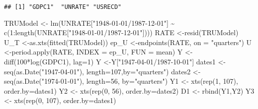 \documentclass[
]{book}
\newenvironment{Shaded}{\begin{snugshade}}{\end{snugshade}}
\newcommand{\AttributeTok}[1]{\textcolor[rgb]{0.77,0.63,0.00}{#1}}
\newcommand{\DecValTok}[1]{\textcolor[rgb]{0.00,0.00,0.81}{#1}}
\newcommand{\FunctionTok}[1]{\textcolor[rgb]{0.00,0.00,0.00}{#1}}
\newcommand{\NormalTok}[1]{#1}
\newcommand{\OtherTok}[1]{\textcolor[rgb]{0.56,0.35,0.01}{#1}}
\newcommand{\SpecialCharTok}[1]{\textcolor[rgb]{0.00,0.00,0.00}{#1}}
\newcommand{\StringTok}[1]{\textcolor[rgb]{0.31,0.60,0.02}{#1}}
\begin{document}
\begin{verbatim}
## [1] "GDPC1"  "UNRATE" "USRECD"
\end{verbatim}

\begin{Shaded}
\begin{Highlighting}[]
\NormalTok{TRUModel   }\OtherTok{\textless{}{-}} \FunctionTok{lm}\NormalTok{(UNRATE[}\StringTok{"1948{-}01{-}01/1987{-}12{-}01"}\NormalTok{] }\SpecialCharTok{\textasciitilde{}} \FunctionTok{c}\NormalTok{(}\DecValTok{1}\SpecialCharTok{:}\FunctionTok{length}\NormalTok{(UNRATE[}\StringTok{"1948{-}01{-}01/1987{-}12{-}01"}\NormalTok{])))}
\NormalTok{RATE       }\OtherTok{\textless{}{-}}\FunctionTok{resid}\NormalTok{(TRUModel) }
\NormalTok{U\_T        }\OtherTok{\textless{}{-}}\FunctionTok{as.xts}\NormalTok{(}\FunctionTok{fitted}\NormalTok{(TRUModel))}
\NormalTok{ep\_U       }\OtherTok{\textless{}{-}}\FunctionTok{endpoints}\NormalTok{(RATE, }\AttributeTok{on =} \StringTok{"quarters"}\NormalTok{)}
\NormalTok{U          }\OtherTok{\textless{}{-}}\FunctionTok{period.apply}\NormalTok{(RATE, }\AttributeTok{INDEX =}\NormalTok{ ep\_U, }\AttributeTok{FUN =}\NormalTok{ mean)}
\NormalTok{Y          }\OtherTok{\textless{}{-}}\FunctionTok{diff}\NormalTok{(}\DecValTok{100}\SpecialCharTok{*}\FunctionTok{log}\NormalTok{(GDPC1), }\AttributeTok{lag=}\DecValTok{1}\NormalTok{)}
\NormalTok{Y          }\OtherTok{\textless{}{-}}\NormalTok{Y[}\StringTok{"1947{-}04{-}01/1987{-}10{-}01"}\NormalTok{]}
\NormalTok{dates1     }\OtherTok{\textless{}{-}} \FunctionTok{seq}\NormalTok{(}\FunctionTok{as.Date}\NormalTok{(}\StringTok{"1947{-}04{-}01"}\NormalTok{), }\AttributeTok{length=}\DecValTok{107}\NormalTok{,}\AttributeTok{by=}\StringTok{"quarters"}\NormalTok{)}
\NormalTok{dates2     }\OtherTok{\textless{}{-}} \FunctionTok{seq}\NormalTok{(}\FunctionTok{as.Date}\NormalTok{(}\StringTok{"1974{-}01{-}01"}\NormalTok{), }\AttributeTok{length=}\DecValTok{56}\NormalTok{, }\AttributeTok{by=}\StringTok{"quarters"}\NormalTok{)}
\NormalTok{Y1         }\OtherTok{\textless{}{-}} \FunctionTok{xts}\NormalTok{(}\FunctionTok{rep}\NormalTok{(}\DecValTok{1}\NormalTok{, }\DecValTok{107}\NormalTok{), }\AttributeTok{order.by=}\NormalTok{dates1)}
\NormalTok{Y2         }\OtherTok{\textless{}{-}} \FunctionTok{xts}\NormalTok{(}\FunctionTok{rep}\NormalTok{(}\DecValTok{0}\NormalTok{,  }\DecValTok{56}\NormalTok{), }\AttributeTok{order.by=}\NormalTok{dates2)}
\NormalTok{D1         }\OtherTok{\textless{}{-}} \FunctionTok{rbind}\NormalTok{(Y1,Y2)}
\NormalTok{Y3         }\OtherTok{\textless{}{-}} \FunctionTok{xts}\NormalTok{(}\FunctionTok{rep}\NormalTok{(}\DecValTok{0}\NormalTok{, }\DecValTok{107}\NormalTok{), }\AttributeTok{order.by=}\NormalTok{dates1)}

\end{Highlighting}
\end{Shaded}
\end{document}
